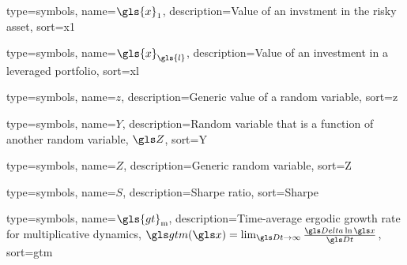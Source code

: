 {
  type={symbols}, 
  name={\ensuremath{\gls{x}_1}},
  description={Value of an invstment in the risky asset},
  sort=x1
}

{
  type={symbols}, 
  name={\ensuremath{\gls{x}_{\gls{l}}}},
  description={Value of an investment in a leveraged portfolio},
  sort=xl
}

{
  type={symbols}, 
  name={\ensuremath{z}},
  description={Generic value of a random variable},
  sort=z
}

{
  type={symbols}, 
  name={\ensuremath{Y}},
  description={Random variable that is a function of another random variable, $\Z$},
  sort=Y
}

{
  type={symbols}, 
  name={\ensuremath{Z}},
  description={Generic random variable},
  sort=Z
}


{
  type={symbols}, 
  name={\ensuremath{S}},
  description={Sharpe ratio},
  sort=Sharpe
}

{
  type={symbols}, 
  name={\ensuremath{\gls{gt}_\text{m}}},
  description={Time-average ergodic growth rate for multiplicative dynamics, $\gtm(\x)=\lim_{\Dt\to\infty}\frac{\D \ln \x}{\Dt}$},
  sort=gtm
}
